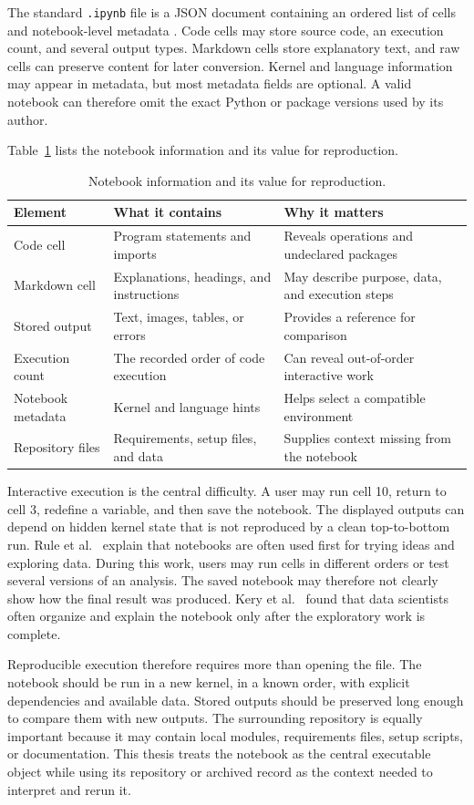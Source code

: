 The standard \texttt{.ipynb} file is a JSON document containing an ordered list of cells and notebook-level metadata \cite{nbformat}. Code cells may store source code, an execution count, and several output types. Markdown cells store explanatory text, and raw cells can preserve content for later conversion. Kernel and language information may appear in metadata, but most metadata fields are optional. A valid notebook can therefore omit the exact Python or package versions used by its author.

Table~\ref{tab:notebook-anatomy} lists the notebook information and its value for reproduction.

\begin{table}[ht]
\centering
\caption{Notebook information and its value for reproduction.}
\label{tab:notebook-anatomy}
\begin{tabularx}{\textwidth}{@{}lXX@{}}
\toprule
Element & What it contains & Why it matters\tabularnewline
\midrule
Code cell & Program statements and imports & Reveals operations and undeclared packages\tabularnewline
Markdown cell & Explanations, headings, and instructions & May describe purpose, data, and execution steps\tabularnewline
Stored output & Text, images, tables, or errors & Provides a reference for comparison\tabularnewline
Execution count & The recorded order of code execution & Can reveal out-of-order interactive work\tabularnewline
Notebook metadata & Kernel and language hints & Helps select a compatible environment\tabularnewline
Repository files & Requirements, setup files, and data & Supplies context missing from the notebook\tabularnewline
\bottomrule
\end{tabularx}
\end{table}

Interactive execution is the central difficulty. A user may run cell 10, return to cell 3, redefine a variable, and then save the notebook. The displayed outputs can depend on hidden kernel state that is not reproduced by a clean top-to-bottom run. Rule et al.~\cite{rule2018} explain that notebooks are often used first for trying ideas and exploring data. During this work, users may run cells in different orders or test several versions of an analysis. The saved notebook may therefore not clearly show how the final result was produced. Kery et al.~\cite{kery2018} found that data scientists often organize and explain the notebook only after the exploratory work is complete.

Reproducible execution therefore requires more than opening the file. The notebook should be run in a new kernel, in a known order, with explicit dependencies and available data. Stored outputs should be preserved long enough to compare them with new outputs. The surrounding repository is equally important because it may contain local modules, requirements files, setup scripts, or documentation. This thesis treats the notebook as the central executable object while using its repository or archived record as the context needed to interpret and rerun it.

